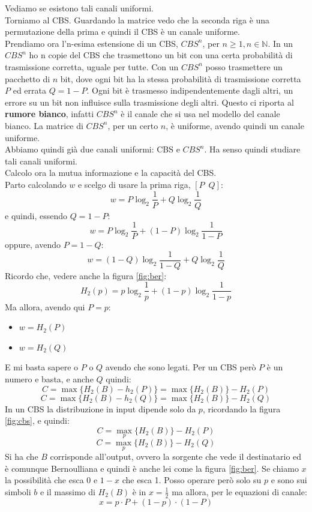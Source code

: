 \documentclass[a4paper,12pt, oneside]{book}
\begin{document}
Vediamo se esistono tali canali uniformi.\\
Torniamo al CBS. Guardando la matrice vedo che la seconda riga è una
permutazione della prima e quindi il CBS è un canale uniforme.\\
Prendiamo ora l'n-esima estensione di un CBS, $CBS^n$, per $n\geq 1,
n\in\mathbb{N}$. In un $CBS^n$ ho n copie del CBS che trasmettono un bit con una
certa probabilità di trasmissione corretta, uguale per tutte. Con un $CBS^n$
posso trasmettere un pacchetto di $n$ bit, dove ogni bit ha la stessa
probabilità di trasmissione corretta $P$ ed errata $Q=1-P$. Ogni bit è
trasmesso indipendentemente dagli altri, un errore su un bit non influisce sulla
trasmissione degli altri. Questo ci riporta al \textbf{rumore bianco}, infatti
$CBS^n$ è il canale che si usa nel modello del canale bianco. La matrice di
$CBS^n$, per un certo $n$, è uniforme, avendo quindi un canale uniforme.\\
Abbiamo quindi già due canali uniformi: CBS e $CBS^n$. Ha senso quindi studiare
tali canali uniformi.\\
Calcolo ora la mutua informazione e la capacità del CBS.\\
Parto calcolando $w$ e scelgo di usare la prima riga, $[P\,\,\,Q]$:
\[w=P\log_2\frac{1}{P}+Q\log_2\frac{1}{Q}\]
e quindi, essendo $Q=1-P$:
\[w=P\log_2\frac{1}{P}+(1-P)\log_2\frac{1}{1-P}\]
oppure, avendo $P=1-Q$:
\[w=(1-Q)\log_2\frac{1}{1-Q}+Q\log_2\frac{1}{Q}\]
Ricordo che, vedere anche la figura \ref{fig:ber}:
\[H_2(p)=p\log_2\frac{1}{p}+(1-p)\log_2\frac{1}{1-p}\]
Ma allora, avendo qui $P=p$:
\begin{itemize}
  \item $w=H_2(P)$
  \item $w=H_2(Q)$
\end{itemize}
E mi basta sapere o $P$ o $Q$ avendo che sono legati. Per un CBS però $P$ è un
numero e basta, e anche $Q$ quindi:
\[C=\max \{H_2(B)-h_2(P)\}=\max \{H_2(B)\}-H_2(P)\]
\[C=\max \{H_2(B)-h_2(Q)\}=\max \{H_2(B)\}-H_2(Q)\]
In un CBS la distribuzione in input dipende solo da $p$, ricordando la figura
\ref{fig:cbs}, e quindi: 
\[C=\max_p \{H_2(B)\}-H_2(P)\]
\[C=\max_p \{H_2(B)\}-H_2(Q)\]
Si ha che $B$ corrisponde all'output, ovvero la sorgente che vede il
destinatario ed è comunque Bernoulliana e quindi è anche lei come la figura
\ref{fig:ber}. Se chiamo $x$ la possibilità che esca 0 e $1-x$ che esca 1. Posso
operare però solo su $p$ e sono sui simboli $b$ e il massimo di $H_2(B)$ è in
$x=\frac{1}{2}$ ma allora, per le equazioni di canale:
\[x=p\cdot P+(1-p)\cdot (1-P)\]
\end{document}
